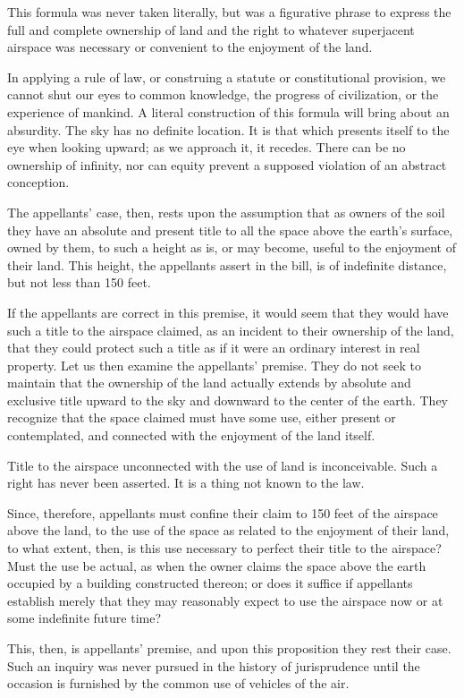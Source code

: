 This formula was never taken literally, but was a figurative phrase to express
the full and complete ownership of land and the right to whatever superjacent
airspace was necessary or convenient to the enjoyment of the land.

In applying a rule of law, or construing a statute or constitutional provision,
we cannot shut our eyes to common knowledge, the progress of civilization, or
the experience of mankind. A literal construction of this formula will bring
about an absurdity. The sky has no definite location. It is that which presents
itself to the eye when looking upward; as we approach it, it recedes. There can
be no ownership of infinity, nor can equity prevent a supposed violation of an
abstract conception.

The appellants' case, then, rests upon the assumption that as owners of the soil
they have an absolute and present title to all the space above the earth's
surface, owned by them, to such a height as is, or may become, useful to the
enjoyment of their land. This height, the appellants assert in the bill, is of
indefinite distance, but not less than 150 feet.

If the appellants are correct in this premise, it would seem that they would
have such a title to the airspace claimed, as an incident to their ownership of
the land, that they could protect such a title as if it were an ordinary
interest in real property. Let us then examine the appellants' premise. They do
not seek to maintain that the ownership of the land actually extends by
absolute and exclusive title upward to the sky and downward to the center of
the earth. They recognize that the space claimed must have some use, either
present or contemplated, and connected with the enjoyment of the land itself.

Title to the airspace unconnected with the use of land is inconceivable. Such a
right has never been asserted. It is a thing not known to the law.

Since, therefore, appellants must confine their claim to 150 feet of the
airspace above the land, to the use of the space as related to the enjoyment of
their land, to what extent, then, is this use necessary to perfect their title
to the airspace? Must the use be actual, as when the owner claims the space
above the earth occupied by a building constructed thereon; or does it suffice
if appellants establish merely that they may reasonably expect to use the
airspace now or at some indefinite future time?

This, then, is appellants' premise, and upon this proposition they rest their
case. Such an inquiry was never pursued in the history of jurisprudence until
the occasion is furnished by the common use of vehicles of the air.


